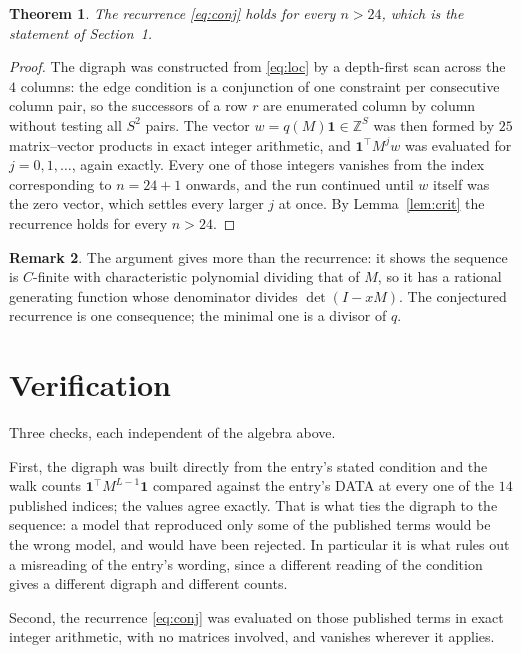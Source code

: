 \documentclass[11pt,a4paper]{article}
\theoremstyle{plain}
\newtheorem{theorem}{Theorem}
\theoremstyle{definition}
\newtheorem{remark}[theorem]{Remark}
\begin{document}
\begin{theorem}
The recurrence \eqref{eq:conj} holds for every $n>24$, which is the statement of
Section~1.
\end{theorem}

\begin{proof}
The digraph was constructed from \eqref{eq:loc} by a depth-first scan across the $4$
columns: the edge condition is a conjunction of one constraint per consecutive column
pair, so the successors of a row $r$ are enumerated column by column without testing all
$S^2$ pairs. The vector $w=q(M)\mathbf{1}\in\mathbb{Z}^{S}$ was then formed by $25$
matrix--vector products in exact integer arithmetic, and $\mathbf{1}^{\!\top}M^{j}w$ was
evaluated for $j=0,1,\dots$, again exactly. Every one of those integers vanishes from the
index corresponding to $n=24+1$ onwards, and the run continued until $w$ itself was the
zero vector, which settles every larger $j$ at once. By Lemma~\ref{lem:crit} the recurrence
holds for every $n>24$.
\end{proof}

\begin{remark}
The argument gives more than the recurrence: it shows the sequence is $C$-finite with
characteristic polynomial dividing that of $M$, so it has a rational generating function
whose denominator divides $\det(I-xM)$. The conjectured recurrence is one consequence; the
minimal one is a divisor of $q$.
\end{remark}

\section{Verification}

Three checks, each independent of the algebra above.

First, the digraph was built directly from the entry's stated condition and the walk counts
$\mathbf{1}^{\!\top}M^{L-1}\mathbf{1}$ compared against the entry's DATA at
every one of the $14$ published indices; the values agree exactly. That is what ties
the digraph to the sequence: a model that reproduced only some of the published terms would
be the wrong model, and would have been rejected. In particular it is what rules out a
misreading of the entry's wording, since a different reading of the condition gives a
different digraph and different counts.

Second, the recurrence \eqref{eq:conj} was evaluated on those published terms in exact
integer arithmetic, with no matrices involved, and vanishes wherever it applies.
\end{document}
